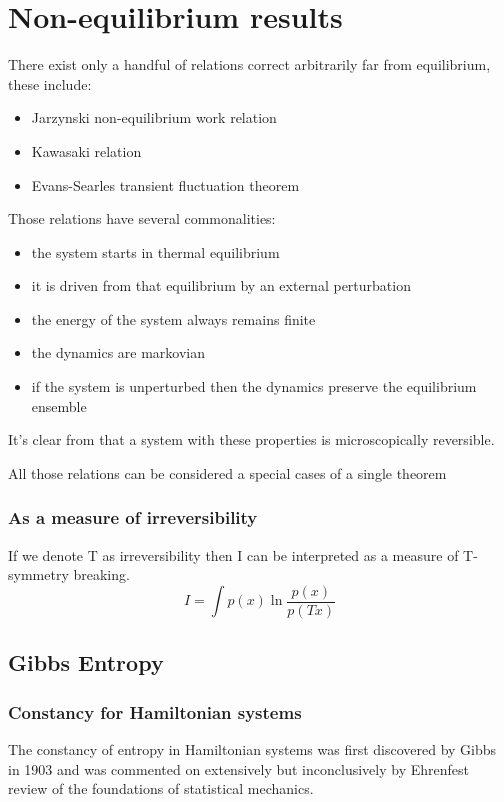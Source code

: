 \documentclass[a4paper,12pt,nofootinbib]{article}
\begin{document}
\section{Non-equilibrium results}
There exist only a handful of relations correct arbitrarily far from equilibrium, these include:
\begin{itemize}
  \item Jarzynski non-equilibrium work relation
  \item Kawasaki relation
  \item Evans-Searles transient fluctuation theorem
\end{itemize}
Those relations have several commonalities:
\begin{itemize}
  \item the system starts in thermal equilibrium
  \item it is driven from that equilibrium by an external perturbation
  \item the energy of the system always remains finite
  \item the dynamics are markovian 
  \item if the system is unperturbed then the dynamics preserve the equilibrium ensemble
\end{itemize}
It's clear from that a system with these properties is microscopically reversible.

All those relations can be considered a special cases of a single theorem

\subsubsection{As a measure of irreversibility}
If we denote T as irreversibility then I can be interpreted as a measure of T-symmetry breaking.
\begin{displaymath}
  I =\int p(x) \ln{\frac{p( x)}{p(T x)}}
\end{displaymath}



\subsection{Gibbs Entropy}

\subsubsection{Constancy for Hamiltonian systems}

The constancy of entropy in Hamiltonian systems was first discovered by Gibbs in 1903 and was commented on extensively but inconclusively by Ehrenfest review of the foundations of statistical mechanics.
\end{document}
